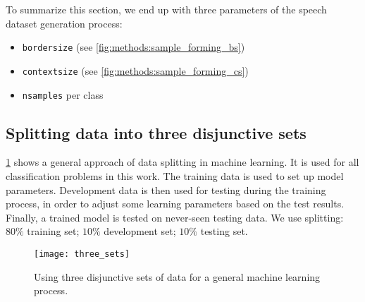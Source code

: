 To summarize this section, we end up with three parameters of the speech dataset generation process:

\begin{itemize}
\item \texttt{border\textunderscore size} (see \cref{fig:methods:sample_forming_bs})
\item \texttt{context\textunderscore size} (see \cref{fig:methods:sample_forming_cs})
\item \texttt{n\textunderscore samples} per class
\end{itemize}

\subsection*{Splitting data into three disjunctive sets}
\cref{fig:methods:three_sets} shows a general approach of data splitting in machine learning. It is used for all classification problems in this work. The training data is used to set up model parameters. Development data is then used for testing during the training process, in order to adjust some learning parameters based on the test results. Finally, a trained model is tested on never-seen testing data. We use splitting: $ 80\% $ training set; $ 10\% $ development set; $ 10\% $ testing set.

\begin{figure}[H]
\centering
\texttt{[image: three\_sets]}
\caption{Using three disjunctive sets of data for a general machine learning process.}
\label{fig:methods:three_sets}
\end{figure}